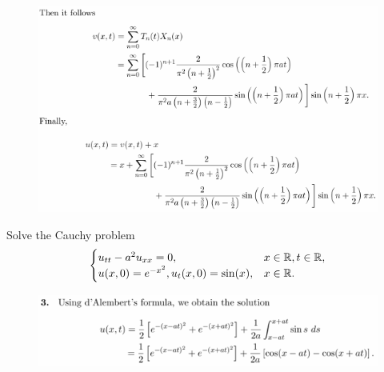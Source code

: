 \begin{figure}[H]
    \includegraphics[width=.8\textwidth]{figures/5.2-5.png}
\end{figure}


\begin{question}{5.3}{}
    Solve the Cauchy problem
    \[
        \begin{cases}
            u_{tt} - a^2u_{xx} = 0, & x\in\mathbb{R}, t\in\mathbb{R}, \\
            u(x,0)=e^{-x^2}, u_t(x,0)=\sin(x), & x\in\mathbb{R}. \\
        \end{cases}
    \]
\end{question}
\begin{figure}[H]
    \includegraphics[width=.9\textwidth]{figures/5.3-1.png}
\end{figure}



